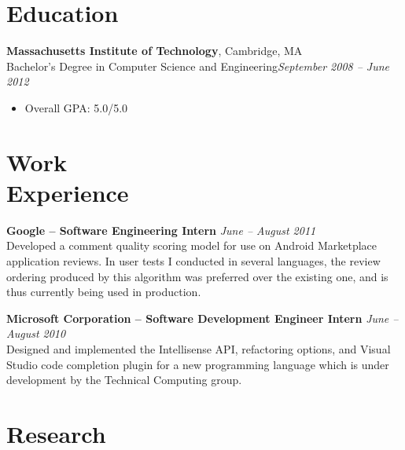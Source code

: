 \documentclass[margin,line]{resume}
\begin{document}
\begin{resume}

\section{\mysidestyle Education}

\textbf{Massachusetts Institute of Technology}, Cambridge, MA \vspace{0mm}\\\vspace{1mm}%
Bachelor's Degree in Computer Science and Engineering\hfill \textsl{September 2008 -- June 2012}\vspace{-0.8mm}
\begin{itemize}
\item Overall GPA: 5.0/5.0 \\
\end{itemize}

\vspace{-6.5mm}

\section{\mysidestyle Work\\Experience}

\textbf{Google -- Software Engineering Intern} \hfill \textsl{June -- August 2011}\\
Developed a comment quality scoring model for use on Android Marketplace application reviews.
In user tests I conducted in several languages, the review ordering produced by this algorithm
was preferred over the existing one, and is thus currently being used in production.

\textbf{Microsoft Corporation -- Software Development Engineer Intern} \hfill \textsl{June -- August 2010}\\
Designed and implemented the Intellisense API, refactoring options, and Visual Studio code completion plugin for a new programming language which is under development by the Technical Computing group.

\section{\mysidestyle Research}


\end{resume}
\end{document}
